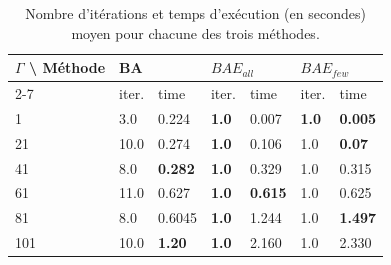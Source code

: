 \documentclass[12pt, a4paper, twoside]{article}
\numberwithin{equation}{section}
\begin{document}
	\begin{table}[H]
		\label{tb:res_initiaux}
		\centering
		\begin{tabular}{@{}|l|llllll@{}}
			\toprule
			\multirow{2}{*}{$\Gamma$ \textbackslash{} Méthode} & \multicolumn{2}{l|}{BA}                                & \multicolumn{2}{l|}{$BAE_{all}$}                              & \multicolumn{2}{l|}{$BAE_{few}$}                              \\ \cmidrule(l){2-7} 
			& iter.                     & time                       & iter.                     & time                       & iter.                     & time                       \\ \midrule
			1                                             & \multicolumn{1}{l|}{3.0} & \multicolumn{1}{l|}{0.224}  & \multicolumn{1}{l|}{\textbf{1.0}} & \multicolumn{1}{l|}{0.007}  & \multicolumn{1}{l|}{\textbf{1.0}} & \multicolumn{1}{l|}{\textbf{0.005}}  \\ \midrule
			21                                            & \multicolumn{1}{l|}{10.0} & \multicolumn{1}{l|}{0.274} & \multicolumn{1}{l|}{\textbf{1.0}} & \multicolumn{1}{l|}{0.106}  & \multicolumn{1}{l|}{1.0} & \multicolumn{1}{l|}{\textbf{0.07}}  \\ \midrule
			41                                            & \multicolumn{1}{l|}{8.0} & \multicolumn{1}{l|}{\textbf{0.282}} & \multicolumn{1}{l|}{\textbf{1.0}} & \multicolumn{1}{l|}{0.329} & \multicolumn{1}{l|}{1.0} & \multicolumn{1}{l|}{0.315}  \\ \midrule
			61                                            & \multicolumn{1}{l|}{11.0} & \multicolumn{1}{l|}{0.627} & \multicolumn{1}{l|}{\textbf{1.0}} & \multicolumn{1}{l|}{\textbf{0.615}}  & \multicolumn{1}{l|}{1.0} & \multicolumn{1}{l|}{0.625} \\ \midrule
			81                                            & \multicolumn{1}{l|}{8.0} & \multicolumn{1}{l|}{0.6045} & \multicolumn{1}{l|}{\textbf{1.0}} & \multicolumn{1}{l|}{1.244}  & \multicolumn{1}{l|}{1.0} & \multicolumn{1}{l|}{\textbf{1.497}} \\ \midrule
			101                                           & \multicolumn{1}{l|}{10.0} & \multicolumn{1}{l|}{\textbf{1.20}} & \multicolumn{1}{l|}{\textbf{1.0}}  & \multicolumn{1}{l|}{2.160}   & \multicolumn{1}{l|}{1.0} & \multicolumn{1}{l|}{2.330}  \\ \bottomrule
		\end{tabular}
		\caption{Nombre d'itérations et temps d'exécution (en secondes) moyen pour chacune des trois méthodes. \cite{portoleauROADEF}}
	\end{table}
		
\end{document}
